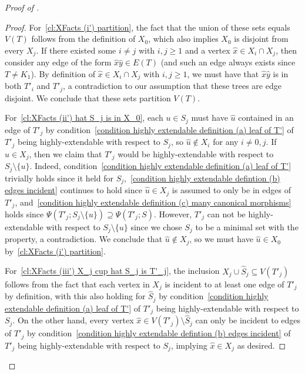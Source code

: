 \documentclass[12pt,letterpaper]{article}
\theoremstyle{definition}
\newcommand{\sm}{\setminus}
\newcommand{\sub}{\subseteq}
\begin{document}
\begin{proof}[Proof of ]
		\begin{proof}
			For~\ref{cl:XFacts (i') partition}, the fact that the union of these sets equals $V(T)$ follows from the definition of $X_0$, which also implies $X_0$ is disjoint from every $X_j$.  If there existed some $i\ne j$ with $i,j\ge 1$ and a vertex $\hat{x}\in X_i\cap X_j$, then consider any edge of the form $\hat{x}\hat{y}\in E(T)$ (and such an edge always exists since $T\ne K_1$).  By definition of $\hat{x}\in X_i\cap X_j$ with $i,j\ge 1$, we must have that $\hat{x}\hat{y}$ is in both $T'_i$ and $T'_j$, a contradiction to our assumption that these trees are edge disjoint.  We conclude that these sets partition $V(T)$.
			
			For~\ref{cl:XFacts (ii') hat S_j is in X_0}, each $u\in S_j$ must have $\hat{u}$ contained in an edge of $T'_j$ by condition~\ref{condition highly extendable definition (a) leaf of T'} of $T'_j$ being highly-extendable with respect to $S_j$, so $\hat{u}\notin X_i$ for any $i\ne 0,j$.  If $\hat{u}\in X_j$, then we claim that $T'_j$ would be highly-extendable with respect to $S_j\sm \{u\}$.  Indeed, condition~\ref{condition highly extendable definition (a) leaf of T'} trivially holds since it held for $S_j$,~\ref{condition highly extendable defintion (b) edges incident} continues to hold since $\hat{u}\in X_j$ is assumed to only be in edges of $T'_j$, and~\ref{condition highly extendable definition (c) many canonical morphisms} holds since $\Psi(T'_j;S_j\sm \{u\})\supseteq \Psi(T'_j;S)$.  However, $T'_j$ can not be highly-extendable with respect to $S_j\sm \{u\}$ since we chose $S_j$ to be a minimal set with the property, a contradiction.  We conclude that $\hat{u}\notin X_j$, so we must have $\hat{u}\in X_0$ by~\ref{cl:XFacts (i') partition}.
			
			For~\ref{cl:XFacts (iii') X_j cup hat S_j is T'_j}, the inclusion $X_j\cup \widehat{S}_j\sub V(T'_j)$ follows from the fact that each vertex in $X_j$ is incident to at least one edge of $T'_j$ by definition, with this also holding for $\widehat{S}_j$ by condition~\ref{condition highly extendable definition (a) leaf of T'} of $T'_j$ being highly-extendable with respect to $S_j$.  On the other hand, every vertex $\hat{x}\in V(T'_j)\sm \widehat{S}_j$ can only be incident to edges of $T'_j$ by condition~\ref{condition highly extendable defintion (b) edges incident} of $T'_j$ being highly-extendable with respect to $S_j$, implying $\hat{x}\in X_j$ as desired.
		\end{proof}
		

\end{proof}
\end{document}
